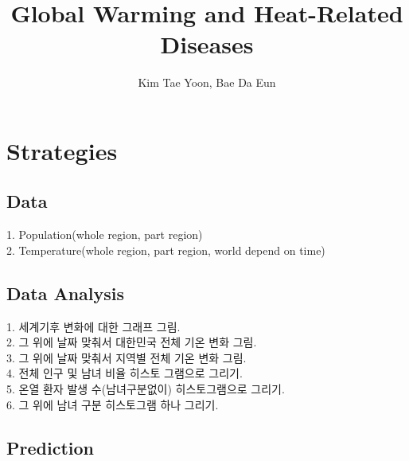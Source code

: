 \documentclass{article}
\title{Global Warming and Heat-Related Diseases}
\author{Kim Tae Yoon, Bae Da Eun}
\begin{document}
\maketitle

\begin{abstract}

\end{abstract}


\section{Strategies}
\subsection{Data}
1. Population(whole region, part region)\\
2. Temperature(whole region, part region, world depend on time)\\

\subsection{Data Analysis}
1. 세계기후 변화에 대한 그래프 그림.\\
2. 그 위에 날짜 맞춰서 대한민국 전체 기온 변화 그림.\\
3. 그 위에 날짜 맞춰서 지역별 전체 기온 변화 그림.\\
4. 전체 인구 및 남녀 비율 히스토 그램으로 그리기.\\
5. 온열 환자 발생 수(남녀구분없이) 히스토그램으로 그리기.\\
6. 그 위에 남녀 구분 히스토그램 하나 그리기.\\
\subsection{Prediction}
\end{document}
